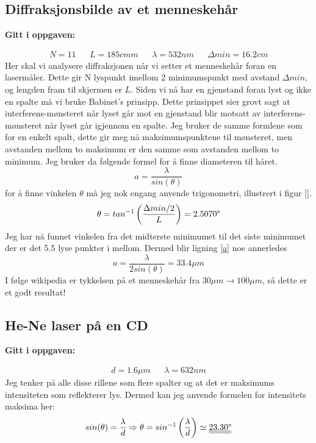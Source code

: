 \documentclass[a4paper,12pt,norsk]{article}
\newcommand{\uu}{\underline}
\begin{document}
\subsection{Diffraksjonsbilde av et menneskehår}
\begin{center}
\textbf{Gitt i oppgaven:}
\end{center}
\begin{align*}
N = 11 && L = 185cm m && \lambda = 532nm && \Delta min = 16.2 cm 
\end{align*}
Her skal vi analysere diffraksjonen når vi setter et menneskehår foran en lasermåler. Dette gir  N  lyspunkt imellom 2 minimumspunkt med avstand $\Delta min$, og lengden fram til skjermen er $L$. Siden vi nå har en gjenstand foran lyst og ikke en spalte må vi bruke Babinet's prinsipp. Dette prinsippet sier grovt sagt at interferens-mønsteret når lyset går mot en gjenstand blir motsatt av interferens-mønsteret når lyset går igjennom en spalte. Jeg bruker de samme formlene som for en enkelt spalt, dette gir meg nå maksimumspunktene til mønsteret, men avstanden mellom to maksimum er den samme som avstanden mellom to minimum. 
Jeg bruker da følgende formel for å finne diameteren til håret.
\begin{equation}
a = \frac{\lambda}{sin(\theta)}
\label{a}
\end{equation}
for å finne vinkelen $\theta$ må jeg nok engang anvende trigonometri, illustrert i figur \vref{}.
$$
\theta = tan^{-1}\left(\frac{\Delta min/2}{L} \right) = 2.5070\degree
$$
Jeg har nå funnet vinkelen fra det midterste minimumet til det siste minimumet der er det 5.5 lyse punkter i mellom. Dermed blir ligning \ref{a} noe annerledes
$$
a = \frac{\lambda}{2sin(\theta)} = 33.4\mu m
$$
I følge wikipedia er tykkelsen på et menneskehår fra $30\mu m \rightarrow100\mu m $, så dette er et godt resultat!

\subsection{He-Ne laser på en CD}
\begin{center}
\textbf{Gitt i oppgaven:}
\end{center}
\begin{align*}
d = 1.6\mu m && \lambda = 632nm 
\end{align*}
Jeg tenker på alle disse rillene som flere spalter og at det er maksimums intensiteten som reflekterer lys. Dermed kan jeg anvende formelen for intensitets maksima her:
$$
sin(\theta) = \frac{\lambda}{d} \Rightarrow \theta = sin^{-1}\left(\frac{\lambda}{d} \right) \simeq \uu{\uu{23.30\degree}}
$$
\end{document}
